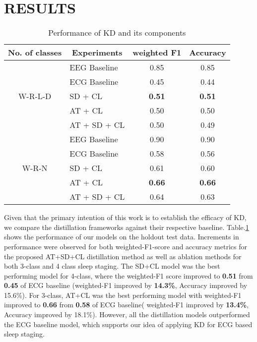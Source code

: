 \documentclass[letterpaper, 10 pt, conference]{ieeeconf}
\begin{document}
\section{RESULTS}
\begin{table}[b]
\vspace{-1.5em}
\caption{Performance of KD and its components
\label{Result_Table}}
\centering
\begin{tabular}{|c|lcc|}
\hline
\textbf{No. of classes} & \multicolumn{1}{c|}{\textbf{Experiments}} & \multicolumn{1}{c|}{\textbf{weighted F1}} & \textbf{Accuracy} \\ \hline
\multirow{5}{*}{W-R-L-D} & EEG Baseline & 0.85          & 0.85          \\
                         & ECG Baseline & 0.45          & 0.44          \\
                         & SD + CL      & \textbf{0.51} & \textbf{0.51} \\
                         & AT + CL      & 0.50          & 0.50          \\
                         & AT + SD + CL & 0.50          & 0.49          \\ \hline
\multirow{5}{*}{W-R-N}   & EEG Baseline & 0.90          & 0.90          \\
                         & ECG Baseline & 0.58          & 0.56          \\
                         & SD + CL      & 0.61          & 0.60          \\
                         & AT + CL      & \textbf{0.66} & \textbf{0.66} \\
                         & AT + SD + CL & 0.64          & 0.63          \\ \hline
\end{tabular}
\vspace{-1.5em}
\end{table}

Given that the primary intention of this work is to establish the efficacy of KD, we compare the distillation frameworks against their respective baseline. Table.\ref{Result_Table} shows the performance of our models on the holdout test data. Increments in performance were observed for both weighted-F1-score and accuracy metrics for the proposed AT+SD+CL distillation method as well as ablation methods for both 3-class and 4 class sleep staging. The SD+CL model was the best performing model for 4-class, where the weighted-F1 score improved to \textbf{0.51} from \textbf{0.45} of ECG baseline (weighted-F1 improved by \textbf{14.3\%}, Accuracy improved by 15.6\%). For 3-class, AT+CL was the best performing model with weighted-F1 improved to \textbf{0.66} from \textbf{0.58} of ECG baseline( weighted-F1 improved by \textbf{13.4\%}, Accuracy improved by 18.1\%). However, all the distillation models outperformed the ECG baseline model, which supports our idea of applying KD for ECG based sleep staging. 
\end{document}
